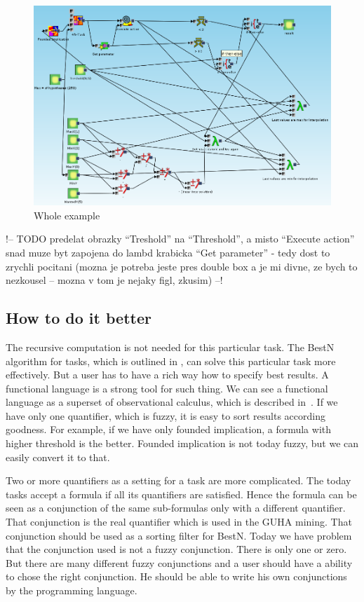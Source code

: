 \documentclass[a4paper,12pt]{book}
\begin{document}
\begin{figure}
	\includegraphics[width=1\textwidth]{exampleResult}
	\caption{Whole example}
	\label{fig:exampleResult}
\end{figure}

!-- TODO predelat obrazky ``Treshold'' na ``Threshold'', a misto ``Execute action'' snad muze byt zapojena do lambd krabicka ``Get parameter'' - tedy dost to zrychli pocitani (mozna je potreba jeste pres double box a je mi divne, ze bych to nezkousel -- mozna v tom je nejaky figl, zkusim) --!

\subsection{How to do it better}
The recursive computation is not needed for this particular task. The BestN algorithm for tasks, which is outlined in \cite{thesisKuchar}, can solve this particular task more effectively. But a user has to have a rich way how to specify best results. A functional language is a strong tool for such thing. We can see a functional language as a superset of observational calculus, which is described in~\cite{GUHAbook}. If we have only one quantifier, which is fuzzy, it is easy to sort results according goodness. For example, if we have only founded implication, a formula with higher threshold is the better. Founded implication is not today fuzzy, but we can easily convert it to that.

Two or more quantifiers as a setting for a task are more complicated. The today tasks accept a formula if all its quantifiers are satisfied. Hence the formula can be seen as a conjunction of the same sub-formulas only with a different quantifier. That conjunction is the real quantifier which is used in the GUHA mining. That conjunction should be used as a sorting filter for BestN. Today we have problem that the conjunction used is not a fuzzy conjunction. There is only one or zero. But there are many different fuzzy conjunctions and a user should have a ability to chose the right conjunction. He should be able to write his own conjunctions by the programming language.
\end{document}
